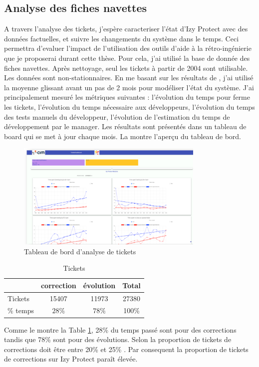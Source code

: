 \documentclass[a4paper]{article}
\begin{document}
\subsection{Analyse des fiches navettes}
\label{sec:analyseDesFichesNavettes}
A travers l'analyse des tickets, j'espère  caracteriser l'état d'Izy Protect avec des données factuelles, 
et suivre  les changements du système dans le temps.
Ceci permettra  d'evaluer l'impact de l'utilisation des outils d'aide à la rétro-ingénierie que je proposerai durant cette thèse.
Pour cela, j'ai utilisé la base de donnée des fiches navettes. 
Après nettoyage, seul les tickets à partir de 2004 sont utilisable. 
Les données sont non-stationnaires. 
En me basant sur les résultats de \cite{Raja09}, j'ai utilisé la moyenne glissant avant un pas de 2 mois pour modéliser l'état du système.
J'ai principalement mesuré les métriques suivantes : l'évolution du temps pour ferme les tickets, l'évolution du temps nécessaire aux développeurs, l'évolution du temps des tests manuels du développeur, l'évolution de l'estimation du temps de développement par le manager.
Les résultats sont présentés dans un tableau de board qui se met à jour chaque mois.
La  montre l'aperçu du tableau de bord.
\begin{figure}[htbp]
  \begin{center}
  \includegraphics[width=0.8\textwidth]{./figures/dashboard.png}
  \caption{Tableau de bord d'analyse de tickets}
  \label{fig:dashboardFig}
\end{center}
\vspace{-0.3cm}
\end{figure}


\begin{table}[htbp]
  \begin{center}
    \caption{Tickets}
    \label{tab:proportion}
    \begin{tabular}{| l | c |c|c|}
      \hline
       & correction  & évolution  & Total\\
      \hline
      Tickets &15407 & 11973  & 27380\\
      \hline
      $\%$ temps & $28\%$ & $78\%$ & 100\% \\
      \hline 
    \end{tabular}
  \end{center}  
\end{table}
Comme le montre la Table \ref{tab:proportion}, 28\% du temps passé sont pour des corrections tandis que 78\% sont  pour des évolutions.
Selon \citet{Pigo96a} la proportion de tickets de corrections doit être entre 20\% et 25\% . 
Par consequent la proportion de tickets de corrections sur Izy Protect paraît élevée.
\end{document}
